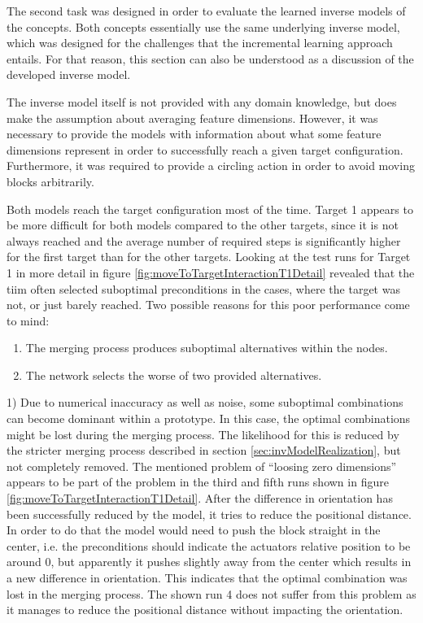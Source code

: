 The second task was designed in order to evaluate the learned inverse models of the concepts. Both concepts essentially use the same underlying inverse model, which was designed for the challenges that the incremental learning approach entails. 
For that reason, this section can also be understood as a discussion of the developed inverse model.

The inverse model itself is not provided with any domain knowledge, but does make the assumption about averaging feature dimensions. 
However, it was necessary to provide the models with information about what some feature dimensions represent in order to successfully reach a given target configuration. 
Furthermore, it was required to provide a circling action in order to avoid moving blocks arbitrarily.

Both models reach the target configuration most of the time. Target 1 appears to be more difficult for both models compared to the other targets, since it is not always reached and the average number of required steps is significantly higher for the first target than for the other targets. 
Looking at the test runs for Target 1 in more detail in figure \ref{fig:moveToTargetInteractionT1Detail} revealed that the \gls{tiim} often selected suboptimal preconditions in the cases, where the target was not, or just barely reached.
Two possible reasons for this poor performance come to mind:
\begin{enumerate}
\item The merging process produces suboptimal alternatives within the nodes.
\item The network selects the worse of two provided alternatives.
\end{enumerate}

1) Due to numerical inaccuracy as well as noise, some suboptimal combinations can become dominant within a prototype. In this case, the optimal combinations might be lost during the merging process. The likelihood for this is reduced by the stricter merging process described in section \ref{sec:invModelRealization}, but not completely removed. The mentioned problem of \enquote{loosing zero dimensions} appears to be part of the problem in the third and fifth runs shown in figure \ref{fig:moveToTargetInteractionT1Detail}. After the difference in orientation has been successfully reduced by the model, it tries to reduce the positional distance. In order to do that the model would need to push the block straight in the center, i.e. the preconditions should indicate the actuators relative position to be around 0, but apparently it pushes slightly away from the center which results in a new difference in orientation. This indicates that the optimal combination was lost in the merging process. The shown run 4 does not suffer from this problem as it manages to reduce the positional distance without impacting the orientation.

